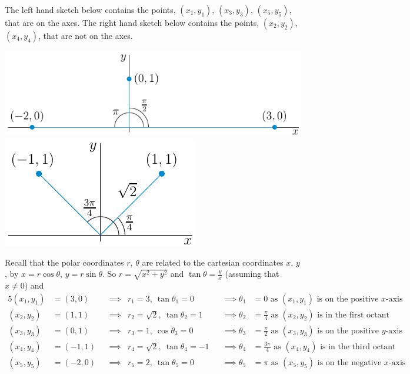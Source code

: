 \begin{solution}
The left hand sketch below contains the points, $(x_1,y_1)$, $(x_3,y_3)$,
$(x_5,y_5)$, that are on the axes. The right hand sketch below contains the
points, $(x_2,y_2)$, $(x_4,y_4)$, that are not on the axes.
\begin{center}
  \includegraphics[scale=0.95]{fig/polar3A.pdf}\quad
  \includegraphics[scale=0.95]{fig/polar2A.pdf}
\end{center}
Recall that the polar coordinates $r$, $\theta$
are related to the cartesian coordinates $x$, $y$, by $x=r\cos\theta$,
$y=r\sin\theta$. So $r=\sqrt{x^2+y^2}$ and $\tan\theta=\frac{y}{x}$
(assuming that $x\ne 0$) and
\begin{alignat*}{5}
(x_1,y_1) &= (3,0) &&\implies &r_1=3,\ \tan\theta_1=0
                   &&\implies \theta_1&=0 
                   \text{ as $(x_1,y_1)$ is on the positive $x$-axis} \\
(x_2,y_2) &= (1,1) &&\implies &r_2=\sqrt{2},\ \tan\theta_2=1
                   &&\implies \theta_2&=\frac{\pi}{4} 
                   \text{ as $(x_2,y_2)$ is in the first octant} \\
(x_3,y_3) &= (0,1) &&\implies &r_3=1,\ \cos\theta_3=0
                   &&\implies \theta_3&=\frac{\pi}{2} 
                   \text{ as $(x_3,y_3)$ is on the positive $y$-axis} \\
(x_4,y_4) &= (-1,1) &&\implies &r_4=\sqrt{2},\ \tan\theta_4=-1
                   &&\implies \theta_4&=\frac{3\pi}{4} 
                   \text{ as $(x_4,y_4)$ is in the third octant} \\
(x_5,y_5) &= (-2,0) &&\implies &r_5=2,\ \tan\theta_5=0
                   &&\implies \theta_5&=\pi 
                   \text{ as $(x_5,y_5)$ is on the negative $x$-axis} 
\end{alignat*}
\end{solution}


